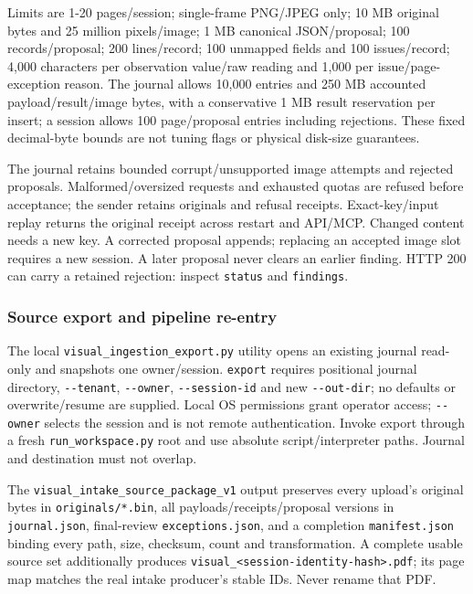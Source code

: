 \documentclass[
]{article}
\begin{document}
Limits are 1-20 pages/session; single-frame PNG/JPEG only; 10 MB
original bytes and 25 million pixels/image; 1 MB canonical
JSON/proposal; 100 records/proposal; 200 lines/record; 100 unmapped
fields and 100 issues/record; 4,000 characters per observation value/raw
reading and 1,000 per issue/page-exception reason. The journal allows
10,000 entries and 250 MB accounted payload/result/image bytes, with a
conservative 1 MB result reservation per insert; a session allows 100
page/proposal entries including rejections. These fixed decimal-byte
bounds are not tuning flags or physical disk-size guarantees.

The journal retains bounded corrupt/unsupported image attempts and
rejected proposals. Malformed/oversized requests and exhausted quotas
are refused before acceptance; the sender retains originals and refusal
receipts. Exact-key/input replay returns the original receipt across
restart and API/MCP. Changed content needs a new key. A corrected
proposal appends; replacing an accepted image slot requires a new
session. A later proposal never clears an earlier finding. HTTP 200 can
carry a retained rejection: inspect \texttt{status} and
\texttt{findings}.

\subsubsection{Source export and pipeline
re-entry}\label{source-export-and-pipeline-re-entry}

The local
\texttt{visual\_\allowbreak{}ingestion\_\allowbreak{}export.py} utility
opens an existing journal read-only and snapshots one owner/session.
\texttt{export} requires positional journal directory,
\texttt{-\/-tenant}, \texttt{-\/-owner}, \texttt{-\/-session-id} and new
\texttt{-\/-out-dir}; no defaults or overwrite/resume are supplied.
Local OS permissions grant operator access; \texttt{-\/-owner} selects
the session and is not remote authentication. Invoke export through a
fresh \texttt{run\_\allowbreak{}workspace.py} root and use absolute
script/interpreter paths. Journal and destination must not overlap.

The
\texttt{visual\_\allowbreak{}intake\_\allowbreak{}source\_\allowbreak{}package\_\allowbreak{}v1}
output preserves every upload's original bytes in
\texttt{originals/\allowbreak{}*.bin}, all payloads/receipts/proposal
versions in \texttt{journal.json}, final-review
\texttt{exceptions.json}, and a completion \texttt{manifest.json}
binding every path, size, checksum, count and transformation. A complete
usable source set additionally produces
\texttt{visual\_\allowbreak{}<session-\allowbreak{}identity-\allowbreak{}hash>.pdf};
its page map matches the real intake producer's stable IDs. Never rename
that PDF.
\end{document}
